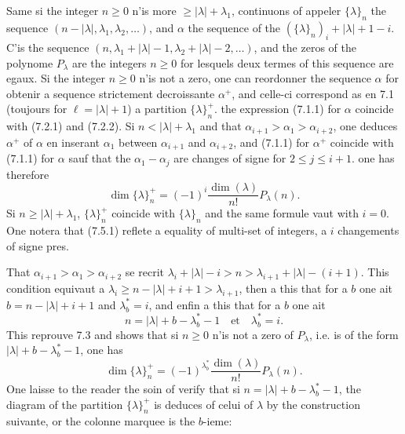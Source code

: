\documentclass[11pt,a4paper]{article}
\theoremstyle{plain}
\theoremstyle{definition}
\begin{document}
\subsection{}
Same si the integer $n \geq 0$ n'is more $\geq |\lambda| + \lambda_1$, continuons of appeler $\{\lambda\}_n$ the sequence $(n - |\lambda|, \lambda_1, \lambda_2, \ldots)$, and $\alpha$ the sequence of the $(\{\lambda\}_n)_i + |\lambda| + 1 - i$. C'is the sequence $(n, \lambda_1 + |\lambda| - 1, \lambda_2 + |\lambda| - 2, \ldots)$, and the zeros of the polynome $P_\lambda$ are the integers $n \geq 0$ for lesquels deux termes of this sequence are egaux. Si the integer $n \geq 0$ n'is not a zero, one can reordonner the sequence $\alpha$ for obtenir a sequence strictement decroissante $\alpha^+$, and celle-ci correspond as en 7.1 (toujours for $\ell = |\lambda| + 1$) a partition $\{\lambda\}^+_n$. the expression (7.1.1) for $\alpha$ coincide with (7.2.1) and (7.2.2). Si $n < |\lambda| + \lambda_1$ and that $\alpha_{i+1} > \alpha_1 > \alpha_{i+2}$, one deduces $\alpha^+$ of $\alpha$ en inserant $\alpha_1$ between $\alpha_{i+1}$ and $\alpha_{i+2}$, and (7.1.1) for $\alpha^+$ coincide with (7.1.1) for $\alpha$ sauf that the $\alpha_1 - \alpha_j$ are changes of signe for $2 \leq j \leq i + 1$. one has therefore
\begin{equation}
\dim \{\lambda\}^+_n = (-1)^i \frac{\dim(\lambda)}{n!} P_\lambda(n). \tag{7.5.1}
\end{equation}
Si $n \geq |\lambda| + \lambda_1$, $\{\lambda\}^+_n$ coincide with $\{\lambda\}_n$ and the same formule vaut with $i = 0$. One notera that (7.5.1) reflete a equality of multi-set of integers, a $i$ changements of signe pres.

That $\alpha_{i+1} > \alpha_1 > \alpha_{i+2}$ se recrit $\lambda_i + |\lambda| - i > n > \lambda_{i+1} + |\lambda| - (i+1)$. This condition equivaut a $\lambda_i \geq n - |\lambda| + i + 1 > \lambda_{i+1}$, then a this that for a $b$ one ait $b = n - |\lambda| + i + 1$ and $\lambda^*_b = i$, and enfin a this that for a $b$ one ait
\[
n = |\lambda| + b - \lambda^*_b - 1 \quad \text{et} \quad \lambda^*_b = i.
\]
This reprouve 7.3 and shows that si $n \geq 0$ n'is not a zero of $P_\lambda$, i.e. is of the form $|\lambda| + b - \lambda^*_b - 1$, one has
\begin{equation}
\dim \{\lambda\}^+_n = (-1)^{\lambda^*_b} \frac{\dim(\lambda)}{n!} P_\lambda(n). \tag{7.5.2}
\end{equation}
One laisse to the reader the soin of verify that si $n = |\lambda| + b - \lambda^*_b - 1$, the diagram of the partition $\{\lambda\}^+_n$ is deduces of celui of $\lambda$ by the construction suivante, or the colonne marquee is the $b$-ieme:
\end{document}
